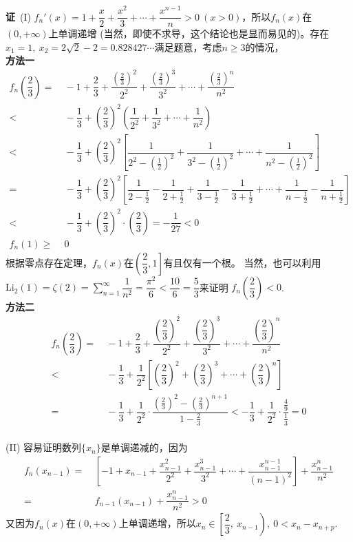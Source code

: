 \begin{enumerate}[label={【\textbf{例\thechapter.\arabic*}】},
 leftmargin=\inteval{\myenumleftmargin}pt,
 itemsep=\inteval{\myenumitempsep}pt,
 itemindent=\inteval{\myenumitemindent}pt]
\textbf{证}\ (I) $ f_n'(x)=1+\dfrac{x}{2}+\dfrac{x^2}{3}+\cdots
+\dfrac{x^{n-1}}{n}>0\ (x>0) $，所以$ f_n(x) $在$ (0,+\infty) $上单调递增
(当然，即使不求导，这个结论也是显而易见的)。存在$ x_1=1,\ 
x_2=2\sqrt{2}-2=0.828427\cdots $满足题意，考虑$ n\geq 3 $的情况，\\
\textbf{方法一}
\begin{align*}
    f_n\left(\dfrac{2}{3}\right)=&\ -1+\dfrac{2}{3}+\dfrac{(\frac{2}{3})^2}{2^2}
    +\dfrac{(\frac{2}{3})^3}{3^2}+\cdots+\dfrac{(\frac{2}{3})^n}{n^2} \\
    <&\ -\dfrac{1}{3}+\left(\dfrac{2}{3}\right)^2\left(\dfrac{1}{2^2}+
    \dfrac{1}{3^2}+\cdots+\dfrac{1}{n^2}\right) \\
    <&\ -\dfrac{1}{3}+\left(\dfrac{2}{3}\right)^2\left[\dfrac{1}{2^2-
        (\frac{1}{2})^2}+\dfrac{1}{3^2-(\frac{1}{2})^2}+\cdots+
    \dfrac{1}{n^2-(\frac{1}{2})^2}\right] \\
    =&\ -\dfrac{1}{3}+\left(\dfrac{2}{3}\right)^2\left[\dfrac{1}{2-
        \frac{1}{2}}-\dfrac{1}{2+\frac{1}{2}}+\dfrac{1}{3-\frac{1}{2}}-
    \dfrac{1}{3+\frac{1}{2}}+\cdots+\dfrac{1}{n-\frac{1}{2}}-
    \dfrac{1}{n+\frac{1}{2}} \right] \\  
    <&\ -\dfrac{1}{3}+\left(\dfrac{2}{3}\right)^2\cdot \left(\dfrac{2}{3}\right)
    =-\dfrac{1}{27}<0 \\
    f_n(1)\geq &\ 0
\end{align*}
根据零点存在定理，$ f_n(x) $在$ \left(\dfrac{2}{3},1\right] $有且仅有一个根。
当然，也可以利用$ \mathrm{Li}_2(1)=\zeta(2)=\sum\limits_{n=1}^{\infty}\dfrac{1}{n^2}=
\dfrac{\pi^2}{6}<\dfrac{10}{6}=\dfrac{5}{3} $来证明
$ f_n\left(\dfrac{2}{3}\right)<0 $. \\
\textbf{方法二} 
\begin{align*}
    f_n\left(\dfrac{2}{3}\right)=&\ -1+\dfrac{2}{3}+\dfrac{(\dfrac{2}{3})^2}{2^2}
    +\dfrac{(\dfrac{2}{3})^3}{3^2}+\cdots+\dfrac{(\dfrac{2}{3})^n}{n^2} \\
    <&\ -\dfrac{1}{3}+\dfrac{1}{2^2}\left[\left(\dfrac{2}{3}\right)^2+
    \left(\dfrac{2}{3}\right)^3+\cdots+\left(\dfrac{2}{3}\right)^n\right] \\
    =&\ -\dfrac{1}{3}+\dfrac{1}{2^2}\cdot \dfrac{\left(\frac{2}{3}\right)^2-
        \left(\frac{2}{3}\right)^{n+1}}{1-\frac{2}{3}} 
    < -\dfrac{1}{3}+\dfrac{1}{2^2}\cdot\dfrac{\frac{4}{9}}{\frac{1}{3}}
    =0 
\end{align*}
\\
(II) 容易证明数列$ \{x_n\} $是单调递减的，因为
\begin{align*}
    f_n(x_{n-1})=&\ \left[-1+x_{n-1}+\dfrac{x_{n-1}^2}{2^2}+
    \dfrac{x_{n-1}^3}{3^2}+\cdots+\dfrac{x_{n-1}^{n-1}}{(n-1)^2}\right]
    +\dfrac{x_{n-1}^n}{n^2}\\=&\ f_{n-1}(x_{n-1})+\dfrac{x_{n-1}^n}{n^2}>0
\end{align*}
又因为$ f_n(x) $在$ (0,+\infty) $上单调递增，所以$ x_n\in\left[\dfrac{2}{3},\ x_{n-1}\right),\ 0<x_n-x_{n+p} $. 


\end{enumerate}
